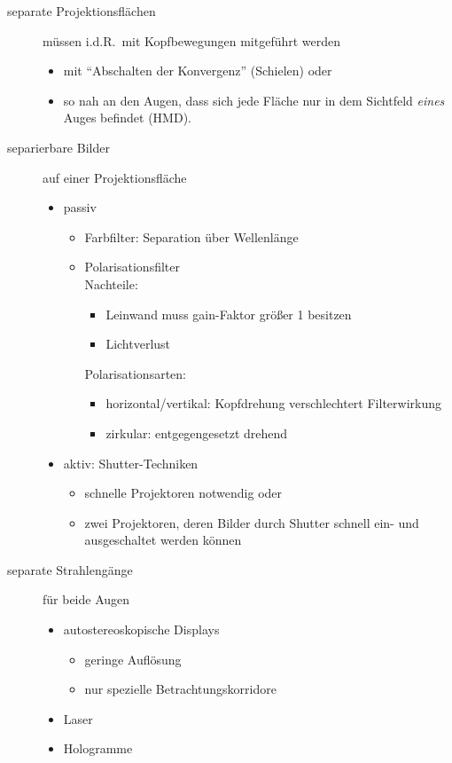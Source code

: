 \documentclass[a4paper, 12pt]{article}
\begin{document}
\begin{description}
  \item[separate Projektionsflächen] müssen i.d.R.\ mit Kopfbewegungen mitgeführt werden
    \begin{itemize}
      \item mit ``Abschalten der Konvergenz'' (Schielen) oder
      \item so nah an den Augen, dass sich jede Fläche nur in dem Sichtfeld \emph{eines} Auges befindet (HMD).
    \end{itemize}
  \item[separierbare Bilder] auf einer Projektionsfläche
    \begin{itemize}
      \item passiv
        \begin{itemize}
          \item Farbfilter: Separation über Wellenlänge
          \item Polarisationsfilter\\
            Nachteile:
            \begin{itemize}
              \item Leinwand muss gain-Faktor größer 1 besitzen
              \item Lichtverlust
            \end{itemize}
            Polarisationsarten:
            \begin{itemize}
              \item horizontal/vertikal: Kopfdrehung verschlechtert Filterwirkung
              \item zirkular: entgegengesetzt drehend
            \end{itemize}
        \end{itemize}
      \item aktiv: Shutter-Techniken
        \begin{itemize}
          \item schnelle Projektoren notwendig oder
          \item zwei Projektoren, deren Bilder durch Shutter schnell ein- und ausgeschaltet werden können
        \end{itemize}
    \end{itemize}
  \item[separate Strahlengänge] für beide Augen
    \begin{itemize}
      \item autostereoskopische Displays
        \begin{itemize}
          \item geringe Auflösung
          \item nur spezielle Betrachtungskorridore
        \end{itemize}
      \item Laser
      \item Hologramme
    \end{itemize}
\end{description}
\end{document}
